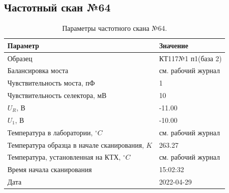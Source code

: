\subsection{Частотный скан №64}
\begin{table}[!ht]
    \centering
    \caption{Параметры частотного скана №64.}
    \begin{tabular}{|l|l|}
        \hline
        Параметр                                       & Значение                  \\ \hline
        Образец                                        & КТ117№1 п1(база 2)        \\ \hline
        Балансировка моста                             & см. рабочий журнал        \\ \hline
        Чувствительность моста, пФ                     & 1                         \\ \hline
        Чувствительность селектора, мВ                 & 10                        \\ \hline
        $U_R$, В                                       & -11.00                    \\ \hline
        $U_1$, В                                       & -10.00                    \\ \hline
        Температура в лаборатории, $^\circ C$          & см. рабочий журнал        \\ \hline
        Температура образца в начале сканирования, $K$ & 263.27                    \\ \hline
        Температура, установленная на КТХ, $^\circ C$  & см. рабочий журнал        \\ \hline
        Время начала сканирования                      & 15:02:32                  \\ \hline
        Дата                                           & 2022-04-29                \\ \hline
    \end{tabular}
    \label{table:frequency_scan_64}
\end{table}

